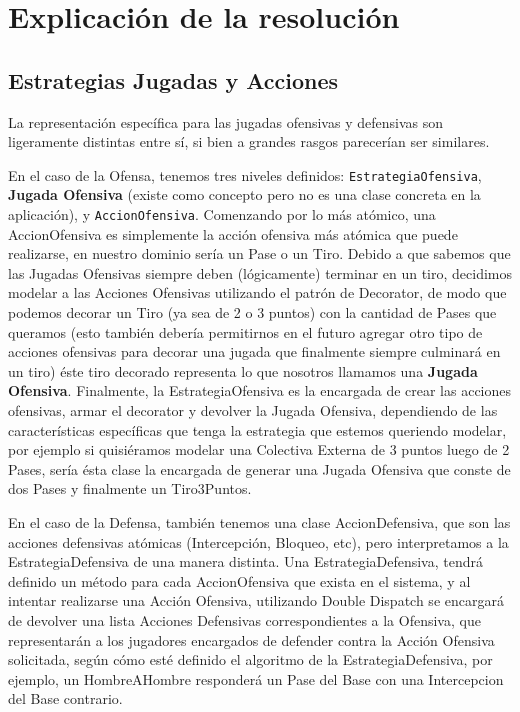 \section{Explicación de la resolución}

\subsection{Estrategias Jugadas y Acciones}

La representación específica para las jugadas ofensivas y defensivas son ligeramente distintas entre sí, si bien a grandes rasgos parecerían ser similares.

En el caso de la Ofensa, tenemos tres niveles definidos: \texttt{EstrategiaOfensiva}, \textbf{Jugada Ofensiva} (existe como concepto pero no es una clase concreta en la aplicación), y \texttt{AccionOfensiva}. Comenzando por lo más atómico, una AccionOfensiva es simplemente la acción ofensiva más atómica que puede realizarse, en nuestro dominio sería un Pase o un Tiro. Debido a que sabemos que las Jugadas Ofensivas siempre deben (lógicamente) terminar en un tiro, decidimos modelar a las Acciones Ofensivas utilizando el patrón de Decorator, de modo que podemos decorar un Tiro (ya sea de 2 o 3 puntos) con la cantidad de Pases que queramos (esto también debería permitirnos en el futuro agregar otro tipo de acciones ofensivas para decorar una jugada que finalmente siempre culminará en un tiro) éste tiro decorado representa lo que nosotros llamamos una \textbf{Jugada Ofensiva}. Finalmente, la EstrategiaOfensiva es la encargada de crear las acciones ofensivas, armar el decorator y devolver la Jugada Ofensiva, dependiendo de las características específicas que tenga la estrategia que estemos queriendo modelar, por ejemplo si quisiéramos modelar una Colectiva Externa de 3 puntos luego de 2 Pases, sería ésta clase la encargada de generar una Jugada Ofensiva que conste de dos Pases y finalmente un Tiro3Puntos.

En el caso de la Defensa, también tenemos una clase AccionDefensiva, que son las acciones defensivas atómicas (Intercepción, Bloqueo, etc), pero interpretamos a la EstrategiaDefensiva de una manera distinta. Una EstrategiaDefensiva, tendrá definido un método para cada AccionOfensiva que exista en el sistema, y al intentar realizarse una Acción Ofensiva, utilizando Double Dispatch se encargará de devolver una lista Acciones Defensivas correspondientes a la Ofensiva, que representarán a los jugadores encargados de defender contra la Acción Ofensiva solicitada, según cómo esté definido el algoritmo de la EstrategiaDefensiva, por ejemplo, un HombreAHombre responderá un Pase del Base con una Intercepcion del Base contrario.

